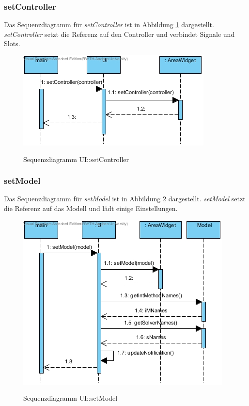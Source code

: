\subsubsection*{setController}

Das Sequenzdiagramm für \emph{setController} ist in Abbildung \ref{Sequenzdiagramm UI::setController} dargestellt. \emph{setController} setzt die Referenz auf den Controller und verbindet Signale und Slots.

\begin{figure}[H]
	\centering
	\includegraphics[scale=.85]{Bilder/UI__setController().jpg}\\
	\caption{Sequenzdiagramm UI::setController}
	\label{Sequenzdiagramm UI::setController}
\end{figure}

\subsubsection*{setModel}

Das Sequenzdiagramm für \emph{setModel} ist in Abbildung \ref{Sequenzdiagramm UI::setModel} dargestellt. \emph{setModel} setzt die Referenz auf das Modell und lädt einige Einstellungen.

\begin{figure}[H]
	\centering
	\includegraphics[scale=.85]{Bilder/UI__setModel().jpg}\\
	\caption{Sequenzdiagramm UI::setModel}
	\label{Sequenzdiagramm UI::setModel}
\end{figure}

